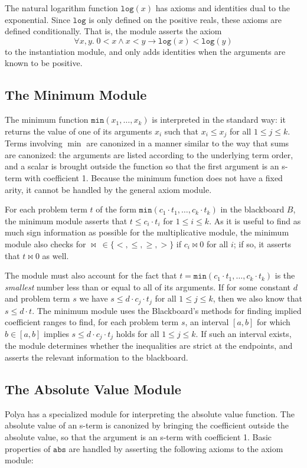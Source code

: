 \documentclass[runningheds]{llncs}
\newcommand{\fn}[1]{\mathtt{#1}} \newcommand{\nroot}{\fn{root}}
\newcommand{\abs}{\fn{abs}}
\begin{document}
The natural logarithm function $\fn{log}(x)$ has axioms and identities dual to the exponential. Since $\fn{log}$ is only defined on the positive reals, these axioms are defined conditionally. That is, the module asserts the axiom
$$
 \forall x, y. \; 0 < x \wedge x < y \to \fn{log}(x) < \fn{log}(y) 
$$
to the instantiation module, and only adds identities when the arguments are known to be positive.

\subsection{The Minimum Module}
\label{subsection:minimum}

The minimum function $\fn{min}(x_1, \ldots, x_k)$ is interpreted in the standard way: it returns the value of one of its arguments $x_i$ such that $x_i \leq x_j$ for all $1\leq j \leq k$. Terms involving $\min$ are canonized in a manner similar to the way that sums are canonized: the arguments are listed according to the underlying term order, and a scalar is brought outside the function so that the first argument is an s-term with coefficient 1. Because the minimum function does not have a fixed arity, it cannot be handled by the general axiom module.

For each problem term $t$ of the form $\fn{min}(c_1 \cdot t_1, \ldots, c_k \cdot t_k)$ in the blackboard $B$, the minimum module asserts that $t \leq c_i \cdot t_i$ for $1\leq i \leq k$. As it is useful to find as much sign information as possible for the multiplicative module, the minimum module also checks for $\bowtie\ \in \{<, \leq, \geq, >\}$ if $c_i \bowtie 0$ for all $i$; if so, it asserts that $t \bowtie 0$ as well.

The module must also account for the fact that $t = \fn{min}(c_1 \cdot t_1, \ldots, c_k \cdot t_k)$ is the \emph{smallest} number less than or equal to all of its arguments. If for some constant $d$ and problem term $s$ we have $s \leq d \cdot c_j\cdot t_j$ for all $1\leq j \leq k$, then we also know that $s \leq d\cdot t$. The minimum module uses the Blackboard's methods for finding implied coefficient ranges  to find, for each problem term $s$, an interval $[a, b]$ for which $b\in [a, b]$ implies $s \leq d \cdot c_j\cdot t_j$ holds for all $1\leq j \leq k$. If such an interval exists, the module determines whether the inequalities are strict at the endpoints, and asserts the relevant information to the blackboard.

\subsection{The Absolute Value Module}
\label{subsection:absolute}
Polya has a specialized module for interpreting the absolute value function. The absolute value of an s-term is canonized by bringing the coefficient outside the absolute value, so that the argument is an s-term with coefficient 1. Basic properties of $\abs$ are handled by asserting the following axioms to the axiom module:
\end{document}
